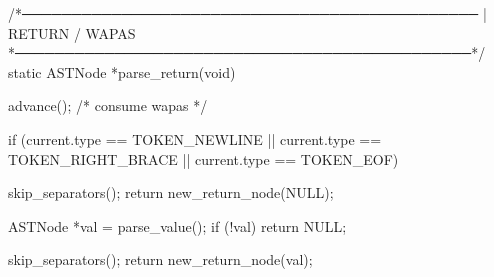 \documentclass{article}
\begin{document}
/*──────────────────────────────────────────────
 | RETURN / WAPAS
 *──────────────────────────────────────────────*/
static ASTNode *parse_return(void)
{
    advance(); /* consume wapas */

    if (current.type == TOKEN_NEWLINE ||
        current.type == TOKEN_RIGHT_BRACE ||
        current.type == TOKEN_EOF) {

        skip_separators();
        return new_return_node(NULL);
    }

       ASTNode *val = parse_value();
    if (!val) return NULL;

    skip_separators();
    return new_return_node(val);
}
\end{document}
